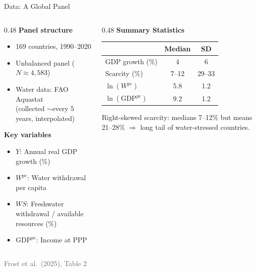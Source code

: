 \documentclass[aspectratio=169,12pt]{beamer}
\newcommand{\source}[1]{\vfill\hfill{\tiny\textcolor{dimgray}{#1}}}
\begin{document}
\begin{frame}{Data: A Global Panel}

\begin{columns}[T]
\begin{column}{0.48\textwidth}
\textbf{Panel structure}
\begin{itemize}
    \item 169 countries, 1990--2020
    \item Unbalanced panel ($N \approx 4{,}583$)
    \item Water data: FAO Aquastat\\(collected $\sim$every 5 years, interpolated)
\end{itemize}

\vspace{0.3cm}
\textbf{Key variables}
\begin{itemize}
    \item $Y$: Annual real GDP growth (\%)
    \item $W^{pc}$: Water withdrawal per capita
    \item $WS$: Freshwater withdrawal / available resources (\%)
    \item $\text{GDP}^{pc}$: Income at PPP
\end{itemize}
\end{column}

\begin{column}{0.48\textwidth}
\vspace{0.2cm}
\centering
{\small\textbf{Summary Statistics}}\\[4pt]
\begin{tabular}{lcc}
\toprule
& Median & SD \\
\midrule
GDP growth (\%) & 4 & 6 \\
Scarcity (\%) & 7--12 & 29--33 \\
$\ln(W^{pc})$ & 5.8 & 1.2 \\
$\ln(\text{GDP}^{pc})$ & 9.2 & 1.2 \\
\bottomrule
\end{tabular}

\vspace{0.5cm}
{\footnotesize Right-skewed scarcity: medians 7--12\% but means 21--28\% $\Rightarrow$ long tail of water-stressed countries.}
\end{column}
\end{columns}

\source{Frost et al.\ (2025), Table 2}
\end{frame}
\end{document}
